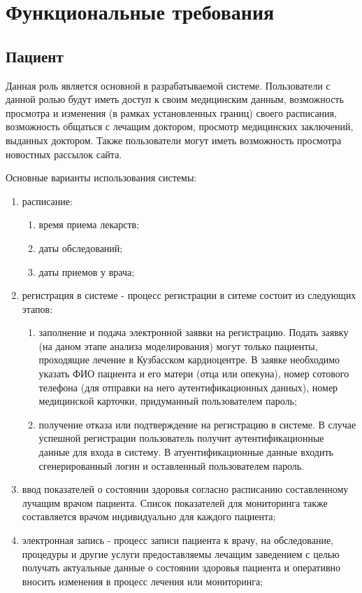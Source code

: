 \section{Функциональные требования}
\subsection{Пациент}
Данная роль является основной в разрабатываемой системе. Пользователи с данной
ролью будут иметь доступ к своим медицинским данным, возможность просмотра и
изменения (в рамках установленных границ) своего расписания, возможность
общаться с лечащим доктором, просмотр медицинских заключений, выданных доктором.
Также пользователи могут иметь возможность просмотра новостных рассылок сайта.

Основные варианты использования системы:

\begin{enumerate}
  \item расписание:
  \begin{enumerate}
    \item время приема лекарств;
    \item даты обследований;
    \item даты приемов у врача;     
  \end{enumerate}
  \item регистрация в системе - процесс регистрации в ситеме состоит из
  следующих этапов:
  \begin{enumerate}
    \item заполнение и подача электронной заявки на регистрацию. Подать заявку
    (на даном этапе анализа моделирования) могут только пациенты, проходящие
    лечение в Кузбасском кардиоцентре. 
    В заявке необходимо указать ФИО пациента и его матери (отца или опекуна), номер сотового телефона (для отправки на него аутентификационных данных), номер медицинской карточки, придуманный пользователем пароль;
    \item получение отказа или подтверждение на регистрацию в системе. В случае
    успешной регистрации пользователь получит аутентификационные данные для
    входа в систему. В атуентификационные данные входить сгенерированный логин и
    оставленный пользователем пароль.
  \end{enumerate}
  \item ввод показателей о состоянии здоровья согласно расписанию составленному
лучащим врачом пациента. Список показателей для мониторинга также составляется
врачом индивидуально для каждого пациента;
  \item электронная запись - процесс записи пациента к врачу, на обследование,
процедуры и другие услуги предоставляемы лечащим заведением с целью получать
актуальные данные о состоянии здоровья пациента и оперативно вносить изменения в процесс лечения или мониторинга;
\end{enumerate}

